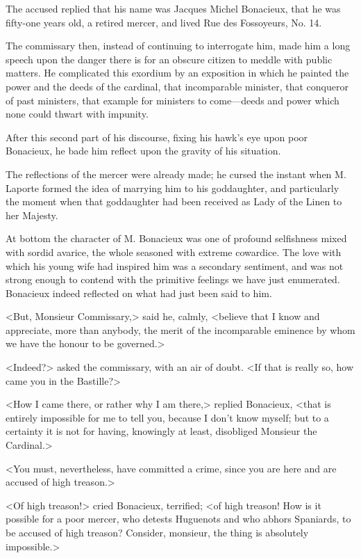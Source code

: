 The accused replied that his name was Jacques Michel Bonacieux, that he was fifty-one years old, a retired mercer, and lived Rue des Fossoyeurs, No. 14. 

The commissary then, instead of continuing to interrogate him, made him a long speech upon the danger there is for an obscure citizen to meddle with public matters. He complicated this exordium by an exposition in which he painted the power and the deeds of the cardinal, that incomparable minister, that conqueror of past ministers, that example for ministers to come---deeds and power which none could thwart with impunity. 

After this second part of his discourse, fixing his hawk's eye upon poor Bonacieux, he bade him reflect upon the gravity of his situation. 

The reflections of the mercer were already made; he cursed the instant when M. Laporte formed the idea of marrying him to his goddaughter, and particularly the moment when that goddaughter had been received as Lady of the Linen to her Majesty. 

At bottom the character of M. Bonacieux was one of profound selfishness mixed with sordid avarice, the whole seasoned with extreme cowardice. The love with which his young wife had inspired him was a secondary sentiment, and was not strong enough to contend with the primitive feelings we have just enumerated. Bonacieux indeed reflected on what had just been said to him. 

<But, Monsieur Commissary,> said he, calmly, <believe that I know and appreciate, more than anybody, the merit of the incomparable eminence by whom we have the honour to be governed.> 

<Indeed?> asked the commissary, with an air of doubt. <If that is really so, how came you in the Bastille?> 

<How I came there, or rather why I am there,> replied Bonacieux, <that is entirely impossible for me to tell you, because I don't know myself; but to a certainty it is not for having, knowingly at least, disobliged Monsieur the Cardinal.> 

<You must, nevertheless, have committed a crime, since you are here and are accused of high treason.> 

<Of high treason!> cried Bonacieux, terrified; <of high treason! How is it possible for a poor mercer, who detests Huguenots and who abhors Spaniards, to be accused of high treason? Consider, monsieur, the thing is absolutely impossible.> 

